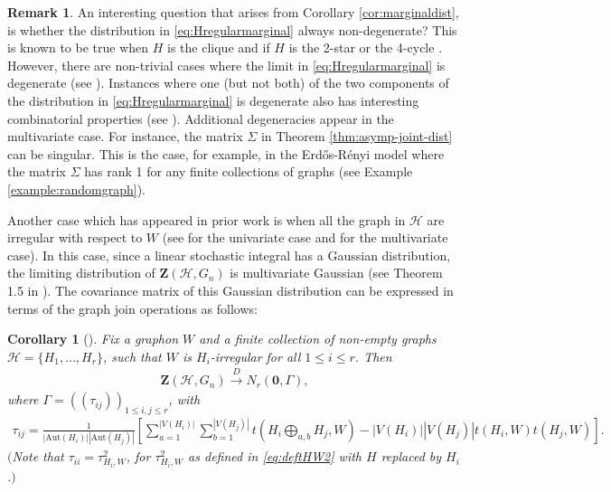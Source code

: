 \documentclass[11pt,reqno]{amsart}
\numberwithin{equation}{section}
\newcommand{\cH}{{\mathcal H}}
\newcommand\Aut{\mathrm{Aut}}
\newcommand\dto{\overset{D}{\rightarrow}}
\newtheorem{corollary}{Corollary}[section]
\theoremstyle{definition}
\newtheorem{remark}{Remark}[section]
\begin{document}
\begin{remark} 

An interesting question that arises from Corollary \ref{cor:marginaldist}, is whether the distribution in \eqref{eq:Hregularmarginal} always non-degenerate? This is known to be true when $H$ is the clique \cite{hladky2019limit} and if $H$ is the 2-star or the 4-cycle \cite{BCJ}. However,  there are non-trivial cases where the limit in \eqref{eq:Hregularmarginal} is degenerate (see \cite[Example 4.6]{BCJ}). Instances where one (but not both) of the two
components of the distribution in \eqref{eq:Hregularmarginal} is degenerate also has interesting combinatorial properties (see \cite[Section 4]{BCJ}). Additional degeneracies appear in the multivariate case. For instance, the matrix $\Sigma$ in Theorem \ref{thm:asymp-joint-dist} can be singular. This is the case, for example, in the Erd\H{o}s-R\'{e}nyi model where the matrix $\Sigma$ has rank 1 for any finite collections of graphs (see Example \ref{example:randomgraph}). 
\end{remark}




Another case which has appeared in prior work is when all the graph in $\cH$ are irregular with respect to $W$ (see \cite{feray2020graphons} for the univariate case and \cite{delmas2021asymptotic} for the multivariate case). In this case, since a linear stochastic integral has a Gaussian distribution, the limiting distribution of $\bm{Z}(\cH, G_n)$ is multivariate Gaussian (see Theorem 1.5 in \cite{gaussianhilbert}). The covariance matrix of this Gaussian distribution can be expressed in terms of the graph join operations as follows: 

\begin{corollary} [{\cite[Corollary 7.6]{delmas2021asymptotic}}] \label{cor:irregjoint} 
    Fix a graphon $W$ and a finite collection of non-empty graphs $\cH = \{H_{1},\ldots, H_{r}\}$, such that $W$ is $H_i$-irregular for all $1 \leq i \leq r$. Then 
    \begin{align*}
        \bm Z(\cH, G_n)\dto N_{r}(\bm 0, \Gamma) , 
    \end{align*} 
    where $\Gamma = ((\tau_{ij}))_{1 \leq i,j \leq r}$, with 
    \begin{align*}
        \tau_{ij} = \frac{1}{|\Aut(H_i)||\Aut(H_j)|}\left[\sum_{a=1}^{|V(H_i)|}\sum_{b=1}^{|V(H_j)|}t\left(H_i\bigoplus_{a,b}H_j,W\right) - |V(H_i)||V(H_j)|t(H_i,W)t(H_j,W)\right] .
    \end{align*}  
 $($Note that $\tau_{ii} = \tau^2_{H_i, W}$, for $\tau^2_{H_i, W}$ as defined in \eqref{eq:deftHW2} with $H$ replaced by $H_i$.$)$
 \end{corollary} 
\end{document}

